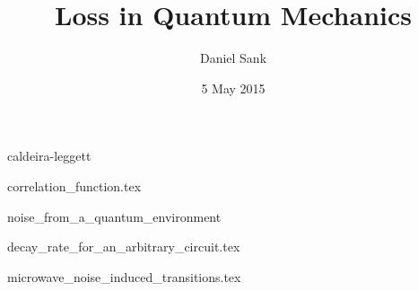 \documentclass{article}
\author{Daniel Sank}
\title{Loss in Quantum Mechanics}
\date{5 May 2015}
\begin{document}
\maketitle
\tableofcontents

{caldeira-leggett}

{correlation_function.tex}

{noise_from_a_quantum_environment}

{decay_rate_for_an_arbitrary_circuit.tex}

{microwave_noise_induced_transitions.tex}





\end{document}
